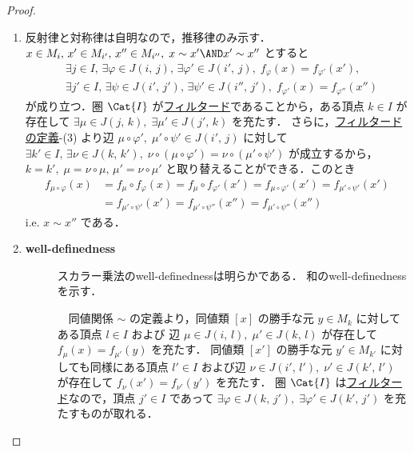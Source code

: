 \documentclass[algtopo_main]{subfiles}
\begin{document}
\begin{proof}
	\begin{enumerate}
		\item 反射律と対称律は自明なので，推移律のみ示す．$x \in M_i,\, x' \in M_{i'},\, x'' \in M_{i''},\;x \sim x' \AND x' \sim x''$ とすると
		\begin{align}
			&\exists j \in I,\, \exists \varphi \in J(i,\, j),\, \exists \varphi' \in J(i',\, j),\; f_{\varphi} (x) = f_{\varphi'}(x'), \\
			&\exists j' \in I,\, \exists \psi \in J(i',\, j'),\, \exists \psi' \in J(i'',\, j'),\; f_{\varphi'} (x) = f_{\varphi''}(x'')
		\end{align}
		が成り立つ．圏 $\Cat{I}$ が\hyperref[def:filtered]{フィルタード}であることから，ある頂点 $k \in I$ が存在して $\exists \mu \in J(j,\, k),\; \exists \mu' \in J(j',\, k)$ を充たす．
		さらに，\hyperref[def:filtered]{フィルタードの定義}-(3) より辺 $\mu \circ \varphi',\; \mu' \circ \psi' \in J(i',\, j)$ に対して $\exists k' \in I,\, \exists \nu \in J(k,\, k'),\; \nu \circ (\mu \circ \varphi') = \nu \circ ( \mu' \circ \psi')$ が成立するから，$k = k',\; \mu = \nu \circ \mu,\, \mu' = \nu \circ \mu'$ と取り替えることができる．このとき
		\begin{align}
			f_{\mu \circ \varphi}(x) &= f_\mu \circ f_{\varphi} (x) = f_\mu \circ f_{\varphi'}(x') = f_{\mu \circ \varphi'}(x') = f_{\mu' \circ \psi'}(x') \\
			&= f_{\mu' \circ \psi'}(x') = f_{\mu' \circ \psi''} (x'') = f_{\mu' \circ \psi''}(x'')
		\end{align}
		i.e. $x \sim x''$ である．
		\item \begin{description}
			\item[\textbf{well-definedness}] スカラー乗法のwell-definednessは明らかである．
			和のwell-definednessを示す．

			　同値関係 $\sim$ の定義より，同値類 $[x]$ の勝手な元 $y \in M_k$ に対してある頂点 $l \in I$ および
			辺 $\mu \in J(i,\, l),\; \mu' \in J(k,\, l)$ が存在して $f_{\mu}(x) = f_{\mu'}(y)$ を充たす．
			同値類 $[x']$ の勝手な元 $y' \in M_{k'}$ に対しても同様にある頂点 $l' \in I$ および辺 $\nu \in J(i',\, l'),\; \nu' \in J(k',\, l')$ が存在して $f_{\nu}(x') = f_{\nu'}(y')$ を充たす．
			圏 $\Cat{I}$ は\hyperref[def:filtered]{フィルタード}なので，頂点 $j' \in I$ であって $\exists \varphi \in J(k,\, j'),\; \exists \varphi' \in J(k',\, j')$ を充たすものが取れる．


\end{description}
\end{enumerate}
\end{proof}
\end{document}

